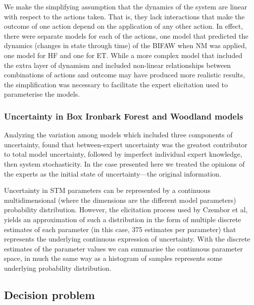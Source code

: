 \documentclass[draft]{article}
\theoremstyle{definition}
\theoremstyle{definition}
\theoremstyle{definition}
\theoremstyle{remark}
\begin{document}
We make the simplifying assumption that the dynamics of the system are
linear with respect to the actions taken. That is, they lack
interactions that make the outcome of one action depend on the
application of any other action. In effect, there were separate models
for each of the actions, one model that predicted the dynamics (changes
in state through time) of the BIFAW when NM was applied, one model for
HF and one for ET. While a more complex model that included the extra
layer of dynamism and included non-linear relationships between
combinations of actions and outcome may have produced more realistic
results, the simplification was necessary to facilitate the expert
elicitation used to parameterise the models.

\subsubsection*{Uncertainty in Box Ironbark Forest and Woodland
models}\label{uncertainty-in-box-ironbark-forest-and-woodland-models}

Analyzing the variation among models which included three components of
uncertainty, \citet{Czembor2011} found that between-expert uncertainty
was the greatest contributor to total model uncertainty, followed by
imperfect individual expert knowledge, then system stochasticity. In the
case presented here we treated the opinions of the experts as the
initial state of uncertainty---the original information.

Uncertainty in STM parameters can be represented by a continuous
multidimensional (where the dimensions are the different model
parameters) probability distribution. However, the elicitation process
used by Czembor et al, yields an approximation of such a distribution in
the form of multiple discrete estimates of each parameter (in this case,
375 estimates per parameter) that represents the underlying continuous
expression of uncertainty. With the discrete estimates of the parameter
values we can summarise the continuous parameter space, in much the same
way as a histogram of samples represents some underlying probability
distribution.

\subsection*{Decision problem}\label{decision-problem}
\end{document}
